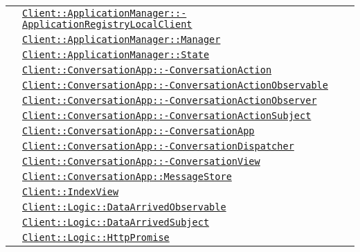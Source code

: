 \begin{longtable}{|>{\centering}m{3cm}|m{10cm}<{\centering}|}
& \hyperref[Client::ApplicationManager::ApplicationRegistryLocalClient]{\texttt{Client::ApplicationManager::-\linebreak ApplicationRegistryLocalClient}}\\
& \hyperref[Client::ApplicationManager::Manager]{\texttt{Client::ApplicationManager::Manager}}\\
& \hyperref[Client::ApplicationManager::State]{\texttt{Client::ApplicationManager::State}}\\
& \hyperref[Client::ConversationApp::ConversationAction]{\texttt{Client::ConversationApp::-\linebreak ConversationAction}}\\
& \hyperref[Client::ConversationApp::ConversationActionObservable]{\texttt{Client::ConversationApp::-\linebreak ConversationActionObservable}}\\
& \hyperref[Client::ConversationApp::ConversationActionObserver]{\texttt{Client::ConversationApp::-\linebreak ConversationActionObserver}}\\
& \hyperref[Client::ConversationApp::ConversationActionSubject]{\texttt{Client::ConversationApp::-\linebreak ConversationActionSubject}}\\
& \hyperref[Client::ConversationApp::ConversationApp]{\texttt{Client::ConversationApp::-\linebreak ConversationApp}}\\
& \hyperref[Client::ConversationApp::ConversationDispatcher]{\texttt{Client::ConversationApp::-\linebreak ConversationDispatcher}}\\
& \hyperref[Client::ConversationApp::ConversationView]{\texttt{Client::ConversationApp::-\linebreak ConversationView}}\\
& \hyperref[Client::ConversationApp::MessageStore]{\texttt{Client::ConversationApp::MessageStore}}\\
& \hyperref[Client::IndexView]{\texttt{Client::IndexView}}\\
& \hyperref[Client::Logic::DataArrivedObservable]{\texttt{Client::Logic::DataArrivedObservable}}\\
& \hyperref[Client::Logic::DataArrivedSubject]{\texttt{Client::Logic::DataArrivedSubject}}\\
& \hyperref[Client::Logic::HttpPromise]{\texttt{Client::Logic::HttpPromise}}\\

\end{longtable}
